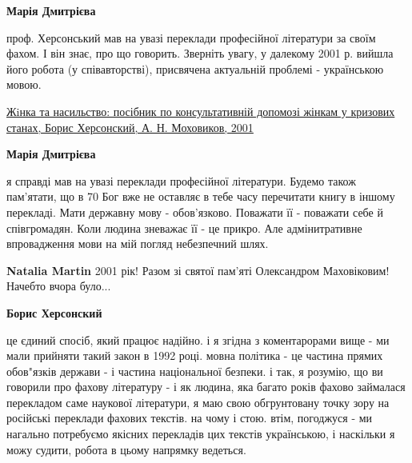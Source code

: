 \begin{itemize}
\begin{itemize}
\textbf{Марія Дмитрієва} 

проф. Херсонський мав на увазі переклади професійної літератури за своїм фахом.
І він знає, про що говорить. Зверніть увагу, у далекому 2001 р. вийшла його
робота (у співавторстві), присвячена актуальній проблемі - українською мовою.

\href{https://www.livelib.ru/book/1003439771-zhinka-ta-nasilstvo-posibnik-po-konsultativnij-dopomozi-zhinkam-u-krizovih-stanah-boris-hersonskij}{%
Жiнка та насильство: посібник по консультативній допомозі жінкам у кризових станах,%
Борис Херсонский, А. Н. Моховиков, 2001%
}

 
\textbf{Марія Дмитрієва} 

я справді мав на увазі переклади професійної літератури. Будемо також
пам'ятати, що в 70 Бог вже не оставляє в тебе часу перечитати книгу в іншому
перекладі. Мати державну мову - обов'язково. Поважати її - поважати себе й
співгромадян. Коли людина зневажає її - це прикро. Але адмінитративне
впровадження мови на мій погляд небезпечний шлях.


 
\textbf{Natalia Martin} 2001 рік! Разом зі святої пам'яті Олександром Маховіковим! Начебто вчора було...

 

\textbf{Борис Херсонский} 

це єдиний спосіб, який працює надійно. і я згідна з коментарорами вище - ми
мали прийняти такий закон в 1992 році. мовна політика - це частина прямих
обов"язків держави - і частина національної безпеки. і так, я розумію, що ви
говорили про фахову літературу - і як людина, яка багато років фахово
займалася перекладом саме наукової літератури, я маю свою обгрунтовану точку
зору на російські переклади фахових текстів. на чому і стою. втім, погоджуся -
ми нагально потребуємо якісних перекладів цих текстів українською, і наскільки
я можу судити, робота в цьому напрямку ведеться.


\end{itemize}
\end{itemize}

